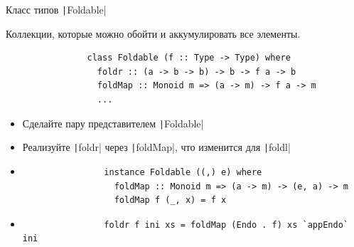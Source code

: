     \begin{frame}[fragile]{Класс типов \texttt|Foldable|}
        \begin{block}{}
            Коллекции, которые можно обойти и аккумулировать все элементы.
            \begin{verbatim}
                class Foldable (f :: Type -> Type) where
                  foldr :: (a -> b -> b) -> b -> f a -> b
                  foldMap :: Monoid m => (a -> m) -> f a -> m
                  ...
            \end{verbatim}
        \end{block}
        \begin{itemize}
            \item[\todo] Сделайте пару представителем \texttt|Foldable|
            \item[\todo] Реализуйте \texttt|foldr| через \texttt|foldMap|, что изменится для \texttt|foldl|
            \item[\answer] \pause
            \begin{verbatim}
                instance Foldable ((,) e) where
                  foldMap :: Monoid m => (a -> m) -> (e, a) -> m
                  foldMap f (_, x) = f x
            \end{verbatim}
            \item[\answer] \pause
            \begin{verbatim}
                foldr f ini xs = foldMap (Endo . f) xs `appEndo` ini
            \end{verbatim}
        \end{itemize}
    \end{frame}

